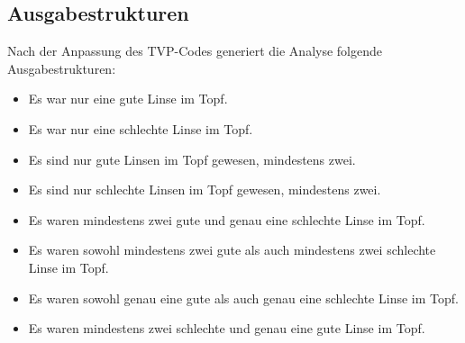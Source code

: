 \subsection{Ausgabestrukturen}
Nach der Anpassung des TVP-Codes generiert die Analyse folgende Ausgabestrukturen:
\begin{itemize}[$\rightarrow$]
	\item Es war nur eine gute Linse im Topf.
	\item Es war nur eine schlechte Linse im Topf.
	\item Es sind nur gute Linsen im Topf gewesen, mindestens zwei.
	\item Es sind nur schlechte Linsen im Topf gewesen, mindestens zwei.
	\item Es waren mindestens zwei gute und genau eine schlechte Linse im Topf.
	\item Es waren sowohl mindestens zwei gute als auch mindestens zwei schlechte Linse im Topf.
	\item Es waren sowohl genau eine gute als auch genau eine schlechte Linse im Topf.
	\item Es waren mindestens zwei schlechte und genau eine gute Linse im Topf.
\end{itemize}